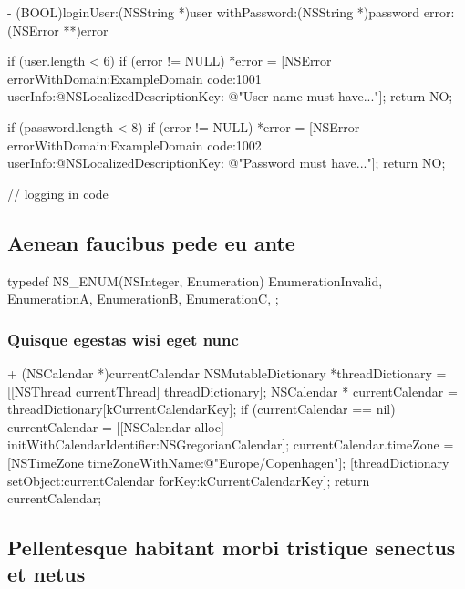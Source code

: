 \documentclass[10pt]{extarticle}
\begin{document}
\begin{codelisting}
- (BOOL)loginUser:(NSString *)user withPassword:(NSString *)password error:(NSError **)error
{
    if (user.length < 6) {
        if (error != NULL)
            *error = [NSError errorWithDomain:ExampleDomain
                                         code:1001
                                     userInfo:@{NSLocalizedDescriptionKey: @"User name must have..."}];
        return NO;
    }
   
    if (password.length < 8)
        if (error != NULL)
            *error = [NSError errorWithDomain:ExampleDomain
                                         code:1002
                                     userInfo:@{NSLocalizedDescriptionKey: @"Password must have..."}];
        return NO;
   
    // logging in code
}
\end{codelisting}

\subsection{Aenean faucibus pede eu ante}

\begin{codelisting}
typedef NS_ENUM(NSInteger, Enumeration) {
    EnumerationInvalid,
    EnumerationA,
    EnumerationB,
    EnumerationC,
};
\end{codelisting}

\subsubsection{Quisque egestas wisi eget nunc}

\begin{codelisting}
+ (NSCalendar *)currentCalendar
{
    NSMutableDictionary *threadDictionary = [[NSThread currentThread] threadDictionary];
    NSCalendar * currentCalendar = threadDictionary[kCurrentCalendarKey];
    if (currentCalendar == nil) {
        currentCalendar = [[NSCalendar alloc] initWithCalendarIdentifier:NSGregorianCalendar];
        currentCalendar.timeZone = [NSTimeZone timeZoneWithName:@"Europe/Copenhagen"];
        [threadDictionary setObject:currentCalendar forKey:kCurrentCalendarKey];
    }
    return currentCalendar;
}
\end{codelisting}

\subsection{Pellentesque habitant morbi tristique senectus et netus}
\end{document}
